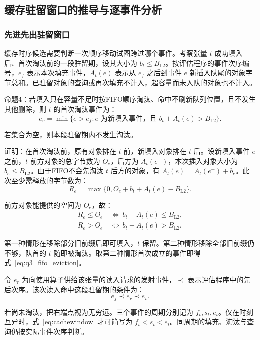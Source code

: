 \subsection{缓存驻留窗口的推导与逐事件分析}
\subsubsection{先进先出驻留窗口}
缓存时序候选需要判断一次顺序移动试图跨过哪个事件。考察张量 $t$ 成功填入后、首次淘汰前的一段驻留期，设其大小为 $b_t\le B_{\mathrm{L2}}$。按评估程序的事件次序编号，$e_f$ 表示本次填充事件，$A_t(e)$ 表示从 $e_f$ 之后到事件 $e$ 新插入队尾的对象字节总和。已驻留对象的查询或再次填充不计入，超容量而未入队的对象也不计入。

命题4：若填入只在容量不足时按FIFO顺序淘汰、命中不刷新队列位置，且不发生其他删除，则 $t$ 的首次淘汰事件为：
\begin{equation}
 e_v=\min\{e>e_f:e\text{ 为新填入事件，且 }b_t+A_t(e)>B_{\mathrm{L2}}\}.
 \label{eq:q3_fifo_eviction}
\end{equation}

若集合为空，则本段驻留期内不发生淘汰。

证明：在首次淘汰前，原有对象排在 $t$ 前，新填入对象排在 $t$ 后。设新填入事件 $e$ 之前，$t$ 前方对象的总字节数为 $O_e$，后方为 $A_t(e^-)$，本次插入对象大小为 $b_e\le B_{\mathrm{L2}}$。由于FIFO不会先淘汰 $t$ 后方的对象，有 $A_t(e)=A_t(e^-)+b_e$。此次至少需释放的字节数为：
\[
 R_e=\max\{0,O_e+b_t+A_t(e)-B_{\mathrm{L2}}\}.
\]

前方对象能提供的空间为 $O_e$，故：
\[
 \begin{aligned}
 R_e\le O_e&\ \Longleftrightarrow\ b_t+A_t(e)\le B_{\mathrm{L2}},\\
 R_e>O_e&\ \Longleftrightarrow\ b_t+A_t(e)>B_{\mathrm{L2}}.
 \end{aligned}
\]

第一种情形在移除部分旧前缀后即可填入，$t$ 保留。第二种情形移除全部旧前缀仍不够，队首的 $t$ 随即被淘汰。取第二种情形首次成立的事件即得式~\eqref{eq:q3_fifo_eviction}。

令 $e_r$ 为向使用算子供给该张量的读入请求的发射事件，$\prec$ 表示评估程序中的先后次序。该次读入命中这段驻留期的条件为：
\begin{equation}
 e_f\prec e_r\prec e_v.
 \label{eq:cachewindow}
\end{equation}

若尚未淘汰，把右端点视为无穷远。三个事件的周期分别记为 $f_t,s_t,e_t$。仅在时刻互异时，式~\eqref{eq:cachewindow} 才可简写为 $f_t<s_t<e_t$。同周期的填充、淘汰与查询仍按实际事件次序判断。

